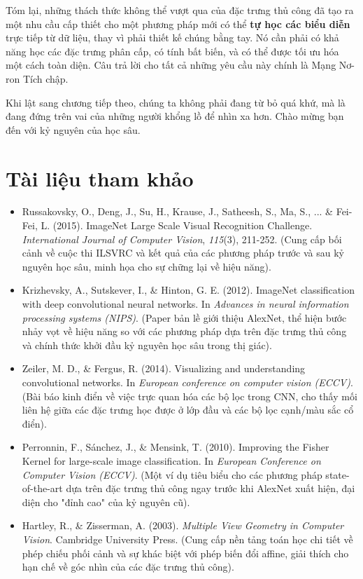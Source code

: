 Tóm lại, những thách thức không thể vượt qua của đặc trưng thủ công đã tạo ra một nhu cầu cấp thiết cho một phương pháp mới có thể \textbf{tự học các biểu diễn} trực tiếp từ dữ liệu, thay vì phải thiết kế chúng bằng tay. Nó cần phải có khả năng học các đặc trưng phân cấp, có tính bất biến, và có thể được tối ưu hóa một cách toàn diện. Câu trả lời cho tất cả những yêu cầu này chính là Mạng Nơ-ron Tích chập.

Khi lật sang chương tiếp theo, chúng ta không phải đang từ bỏ quá khứ, mà là đang đứng trên vai của những người khổng lồ để nhìn xa hơn. Chào mừng bạn đến với kỷ nguyên của học sâu.

\section*{Tài liệu tham khảo}
\begin{itemize}
	\item[1] Russakovsky, O., Deng, J., Su, H., Krause, J., Satheesh, S., Ma, S., ... \& Fei-Fei, L. (2015). ImageNet Large Scale Visual Recognition Challenge. \textit{International Journal of Computer Vision}, \textit{115}(3), 211-252. (Cung cấp bối cảnh về cuộc thi ILSVRC và kết quả của các phương pháp trước và sau kỷ nguyên học sâu, minh họa cho sự chững lại về hiệu năng).
	\item[2] Krizhevsky, A., Sutskever, I., \& Hinton, G. E. (2012). ImageNet classification with deep convolutional neural networks. In \textit{Advances in neural information processing systems (NIPS)}. (Paper bản lề giới thiệu AlexNet, thể hiện bước nhảy vọt về hiệu năng so với các phương pháp dựa trên đặc trưng thủ công và chính thức khởi đầu kỷ nguyên học sâu trong thị giác).
	\item[3] Zeiler, M. D., \& Fergus, R. (2014). Visualizing and understanding convolutional networks. In \textit{European conference on computer vision (ECCV)}. (Bài báo kinh điển về việc trực quan hóa các bộ lọc trong CNN, cho thấy mối liên hệ giữa các đặc trưng học được ở lớp đầu và các bộ lọc cạnh/màu sắc cổ điển).
	\item[4] Perronnin, F., Sánchez, J., \& Mensink, T. (2010). Improving the Fisher Kernel for large-scale image classification. In \textit{European Conference on Computer Vision (ECCV)}. (Một ví dụ tiêu biểu cho các phương pháp state-of-the-art dựa trên đặc trưng thủ công ngay trước khi AlexNet xuất hiện, đại diện cho "đỉnh cao" của kỷ nguyên cũ).
	\item[5] Hartley, R., \& Zisserman, A. (2003). \textit{Multiple View Geometry in Computer Vision}. Cambridge University Press. (Cung cấp nền tảng toán học chi tiết về phép chiếu phối cảnh và sự khác biệt với phép biến đổi affine, giải thích cho hạn chế về góc nhìn của các đặc trưng thủ công).
\end{itemize}